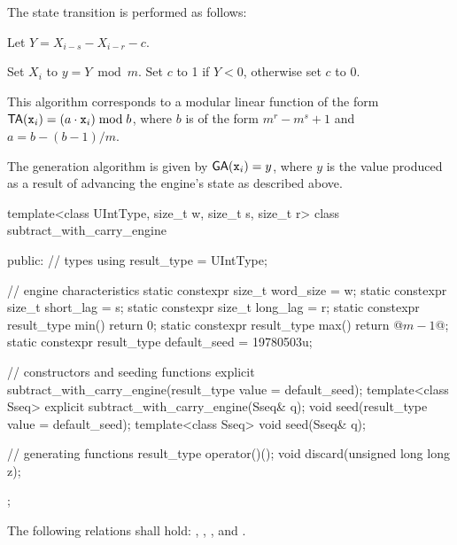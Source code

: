 \pnum
The state transition%
%
is performed as follows:
\begin{enumeratea}
 \item
   Let $ Y = X_{i-s} - X_{i-r} - c $.
 \item
   Set $X_i$ to $ y = Y \bmod m $.
   Set $c$ to 1 if $Y < 0$,
   otherwise set $c$ to 0.
\end{enumeratea}
\begin{note}
 This algorithm corresponds
 to a modular linear function
 of the form
 $ \mathsf{TA}(\texttt{\protect x}_{i}) = (a \cdot \texttt{\protect x}_{i}) \bmod b $,
 where $b$ is of the form
 $ m^r - m^s + 1 $
 and $ a = b - (b-1) / m $.
\end{note}

\pnum
The generation algorithm%
%
is given by
$ \mathsf{GA}(\texttt{\protect x}_{i}) = y $,
where
 $y$
is the value produced
as a result
of advancing the engine's state
as described above.

%
\begin{codeblock}
template<class UIntType, size_t w, size_t s, size_t r>
  class subtract_with_carry_engine {
  public:
    // types
    using result_type = UIntType;

    // engine characteristics
    static constexpr size_t word_size = w;
    static constexpr size_t short_lag = s;
    static constexpr size_t long_lag = r;
    static constexpr result_type min() { return 0; }
    static constexpr result_type max() { return @$m - 1$@; }
    static constexpr result_type default_seed = 19780503u;

    // constructors and seeding functions
    explicit subtract_with_carry_engine(result_type value = default_seed);
    template<class Sseq> explicit subtract_with_carry_engine(Sseq& q);
    void seed(result_type value = default_seed);
    template<class Sseq> void seed(Sseq& q);

    // generating functions
    result_type operator()();
    void discard(unsigned long long z);
  };
\end{codeblock}

\pnum
The following relations shall hold:
  ,
  ,
  ,
and
  .

